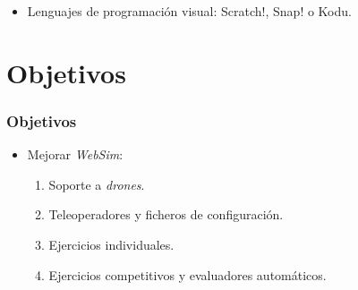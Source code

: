 \documentclass[xcolor={table}]{beamer}
\begin{document}
\begin{frame}
\begin{itemize}
\begin{figure}[H]
\begin{subfigure}{\textwidth}
        \label{fig:mbot}
        \end{subfigure}\hfill
            \label{fig:educativa}
        \end{figure}
        	\item Lenguajes de programación visual: Scratch!, Snap! o Kodu.
  
		\end{itemize}
	\end{frame}

	\section{Objetivos}
		\begin{frame}
			\frametitle{Objetivos}
			\begin{itemize}\itemsep4pt
			    \item Mejorar \textit{WebSim}:
			    \begin{enumerate}\itemsep5pt
			        	\item Soporte a \textit{drones}.
				\item Teleoperadores y ficheros de configuración.
				\item Ejercicios individuales. 
				\item Ejercicios competitivos y evaluadores automáticos. 
			    \end{enumerate}{}
			
			\end{itemize}
		\end{frame}
\end{document}

